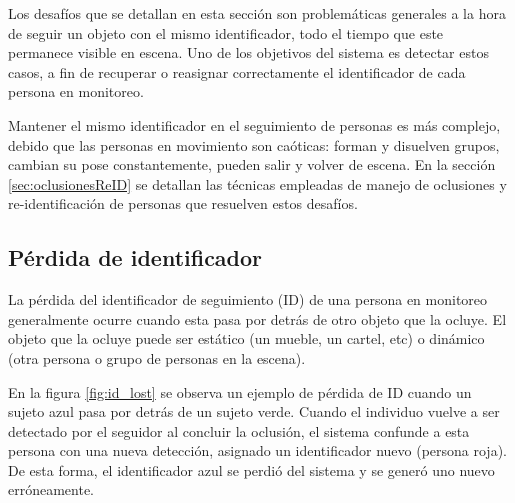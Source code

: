 Los desafíos que se detallan en esta sección son problemáticas generales a la hora de seguir un objeto con el mismo identificador, todo el tiempo que este permanece visible en escena. Uno de los objetivos del sistema es detectar estos casos, a fin de recuperar o reasignar correctamente el identificador de cada persona en monitoreo. 

Mantener el mismo identificador en el seguimiento de personas es más complejo, debido que las personas en movimiento son caóticas: forman y disuelven grupos, cambian su pose constantemente, pueden salir y volver de escena. En la sección \ref{sec:oclusionesReID} se detallan las técnicas empleadas de manejo de oclusiones y re-identificación de personas que resuelven estos desafíos.

\subsection{Pérdida de identificador}

La pérdida del identificador de seguimiento (ID) de una persona en monitoreo generalmente ocurre cuando esta pasa por detrás de otro objeto que la ocluye. El objeto que la ocluye puede ser estático (un mueble, un cartel, etc) o dinámico (otra persona o grupo de personas en la escena).

En la figura \ref{fig:id_lost} se observa un ejemplo de pérdida de ID cuando un sujeto azul pasa por detrás de un sujeto verde. Cuando el individuo vuelve a ser detectado por el seguidor al concluir la oclusión, el sistema confunde a esta persona con una nueva detección, asignado un identificador nuevo (persona roja). De esta forma, el identificador azul se perdió del sistema y se generó uno nuevo erróneamente.

